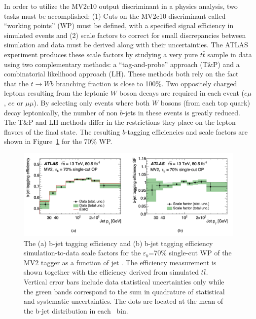 In order to utilize the MV2c10 output discriminant in a physics analysis, two tasks must be accomplished: (1) Cuts on the MV2c10 discriminant called ``working points'' (WP) must be defined, with a specified signal efficiency in simulated events and (2) scale factors to correct for small discrepancies between simulation and data must be derived along with their uncertainties.
The ATLAS experiment produces these scale factors by studying a very pure $t\bar{t}$ sample in data using two complementary methods: a ``tag-and-probe'' approach (T\&P) and a combinatorial likelihood approach (LH).
These methods both rely on the fact that the $t \rightarrow Wb$ branching fraction is close to 100\%.
Two oppositely charged leptons resulting from the leptonic $W$ boson decays are required in each event ($e\mu$, $ee$ or $\mu\mu$).
By selecting only events where both $W$ bosons (from each top quark) decay leptonically, the number of non $b$-jets in these events is greatly reduced. The T\&P and LH methods differ in the restrictions they place on the lepton flavors of the final state. The resulting $b$-tagging efficiencies and scale factors are shown in Figure~\ref{fig:b_tagging_eff_sf} for the 70\% WP.

\begin{figure}
	\centering
	\includegraphics[width=\textwidth]{b_tagging_eff_sf}
	\caption{
	The (a) b-jet tagging efficiency and (b) b-jet tagging efficiency simulation-to-data scale factors for the $\varepsilon_b$=70\% single-cut WP of the MV2 tagger as a function of jet \pt. The efficiency measurement is shown together with the efficiency derived from simulated $t\bar{t}$. Vertical error bars include data statistical uncertainties only while the green bands correspond to the sum in quadrature of statistical and systematic uncertainties. The dots are located at the mean of the b-jet \pt distribution in each \pt\ bin.
    \cite{Aad:2019aic}
	}
	\label{fig:b_tagging_eff_sf}
\end{figure}
